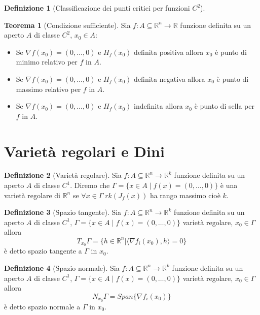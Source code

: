 \documentclass[leqno]{article}
\theoremstyle{definition}
\newtheorem{definition}{Definizione}[section]
\numberwithin{equation}{section}
\newtheorem{theorem}{Teorema}[section]
\theoremstyle{remark}
\begin{document}
	\begin{definition}[Classificazione dei punti critici per funzioni $C^2$]
		\begin{theorem}[Condizione sufficiente]
			Sia $f:A\subseteq \mathbb{R}^n \rightarrow \mathbb{R}$ funzione definita su un aperto $A$ di classe $C^2$, $x_0\in A$:
			\begin{itemize}
				\item Se $\nabla f(x_0)=(0,\dots,0)$ e $H_f(x_0)$ definita positiva allora $x_0$ è punto di minimo relativo per $f$ in $A$.
				\item Se $\nabla f(x_0)=(0,\dots,0)$ e $H_f(x_0)$ definita negativa allora $x_0$ è punto di massimo relativo per $f$ in $A$.
				\item Se $\nabla f(x_0)=(0,\dots,0)$ e $H_f(x_0)$ indefinita allora $x_0$ è punto di sella per $f$ in $A$.
			\end{itemize}
		\end{theorem}
	\end{definition}
	
	\section{Varietà regolari e Dini}
	\begin{definition}[Varietà regolare]
		Sia $f:A\subseteq \mathbb{R}^n \rightarrow \mathbb{R}^{k}$ funzione definita su un aperto $A$ di classe $C^1$. Diremo che $\Gamma=\{ x \in A \; | \; f(x)=(0,\dots,0)\}$ è una varietà regolare di $\mathbb{R}^n$ se $\forall x \in \Gamma \; rk(J_f(x))$ ha rango massimo cioè $k$.
	\end{definition}
	\begin{definition}[Spazio tangente]
		Sia $f:A\subseteq \mathbb{R}^n \rightarrow \mathbb{R}^{k}$ funzione definita su un aperto $A$ di classe $C^1$, $\Gamma=\{ x \in A \; | \; f(x)=(0,\dots,0)\}$ varietà regolare, $x_0\in \Gamma$ allora
		\begin{equation}
			T_{x_0}\Gamma=\{h\in \mathbb{R}^n | \langle \nabla f_i(x_0), h \rangle = 0\}
		\end{equation}
		è detto spazio tangente a $\Gamma$ in $x_0$.
	\end{definition}
	\begin{definition}[Spazio normale]
		Sia $f:A\subseteq \mathbb{R}^n \rightarrow \mathbb{R}^{k}$ funzione definita su un aperto $A$ di classe $C^1$, $\Gamma=\{ x \in A \; | \; f(x)=(0,\dots,0)\}$ varietà regolare, $x_0\in \Gamma$ allora
		\begin{equation}
			N_{x_0}\Gamma=Span\{\nabla f_i (x_0)\}
		\end{equation}
		è detto spazio normale a $\Gamma$ in $x_0$.
	\end{definition}
	
\end{document}

